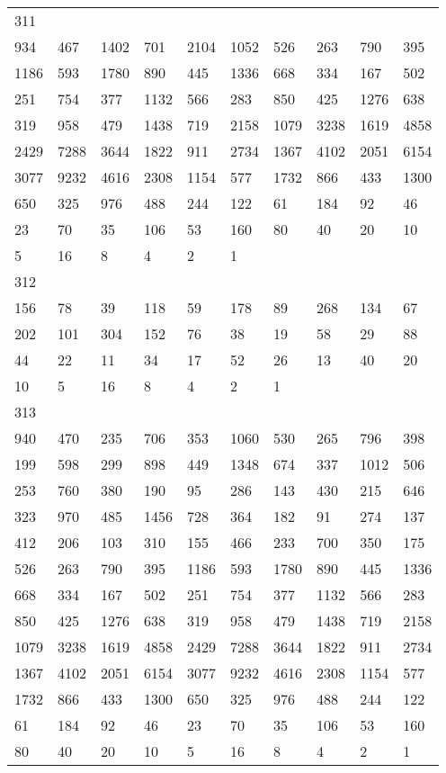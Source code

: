 \begin{longtable}{*{10}{l}}
311&&&&&&&&&\\
934& 467& 1402& 701& 2104& 1052& 526& 263& 790& 395\\
1186& 593& 1780& 890& 445& 1336& 668& 334& 167& 502\\
251& 754& 377& 1132& 566& 283& 850& 425& 1276& 638\\
319& 958& 479& 1438& 719& 2158& 1079& 3238& 1619& 4858\\
2429& 7288& 3644& 1822& 911& 2734& 1367& 4102& 2051& 6154\\
3077& 9232& 4616& 2308& 1154& 577& 1732& 866& 433& 1300\\
650& 325& 976& 488& 244& 122& 61& 184& 92& 46\\
23& 70& 35& 106& 53& 160& 80& 40& 20& 10\\
5& 16& 8& 4& 2& 1& \\

312&&&&&&&&&\\
156& 78& 39& 118& 59& 178& 89& 268& 134& 67\\
202& 101& 304& 152& 76& 38& 19& 58& 29& 88\\
44& 22& 11& 34& 17& 52& 26& 13& 40& 20\\
10& 5& 16& 8& 4& 2& 1& \\

313&&&&&&&&&\\
940& 470& 235& 706& 353& 1060& 530& 265& 796& 398\\
199& 598& 299& 898& 449& 1348& 674& 337& 1012& 506\\
253& 760& 380& 190& 95& 286& 143& 430& 215& 646\\
323& 970& 485& 1456& 728& 364& 182& 91& 274& 137\\
412& 206& 103& 310& 155& 466& 233& 700& 350& 175\\
526& 263& 790& 395& 1186& 593& 1780& 890& 445& 1336\\
668& 334& 167& 502& 251& 754& 377& 1132& 566& 283\\
850& 425& 1276& 638& 319& 958& 479& 1438& 719& 2158\\
1079& 3238& 1619& 4858& 2429& 7288& 3644& 1822& 911& 2734\\
1367& 4102& 2051& 6154& 3077& 9232& 4616& 2308& 1154& 577\\
1732& 866& 433& 1300& 650& 325& 976& 488& 244& 122\\
61& 184& 92& 46& 23& 70& 35& 106& 53& 160\\
80& 40& 20& 10& 5& 16& 8& 4& 2& 1\\


\end{longtable}
